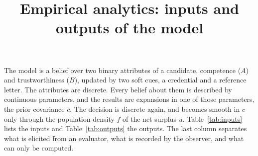 \documentclass[11pt,a4paper]{article}
\title{Empirical analytics: inputs and outputs of the model}
\author{}
\date{}
\begin{document}
\maketitle

\noindent The model is a belief over two binary attributes of a candidate,
competence ($A$) and trustworthiness ($B$), updated by two soft cues, a
credential and a reference letter. The attributes are discrete. Every belief
about them is described by continuous parameters, and the results are
expansions in one of those parameters, the prior covariance $c$. The decision
is discrete again, and becomes smooth in $c$ only through the population
density $f$ of the net surplus $u$. Table~\ref{tab:inputs} lists the inputs and
Table~\ref{tab:outputs} the outputs. The last column separates what is
elicited from an evaluator, what is recorded by the observer, and what can only
be computed.
\end{document}
